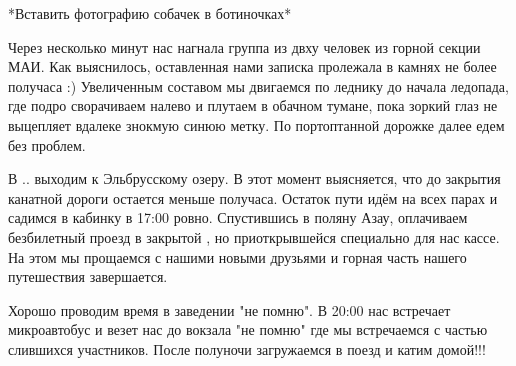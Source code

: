 *Вставить фотографию собачек в ботиночках*

Через несколько минут нас нагнала группа из двху человек из горной секции МАИ. Как выяснилось, оставленная нами записка пролежала в камнях не более получаса :) Увеличенным составом мы двигаемся по леднику до начала ледопада, где подро сворачиваем налево и плутаем в обачном тумане, пока зоркий глаз не выцепляет вдалеке знокмую синюю метку. По портоптанной дорожке далее едем без проблем. 

В .. выходим к Эльбрусскому озеру. В этот момент выясняется, что до закрытия канатной дороги остается меньше получаса. Остаток пути идём на всех парах и садимся в кабинку в 17:00 ровно. Спустившись в поляну Азау, оплачиваем безбилетный проезд в закрытой , но приоткрывшейся специально для нас кассе. На этом мы прощаемся с нашими новыми друзьями и горная часть нашего путешествия завершается.

Хорошо проводим время в заведении "не помню". В 20:00 нас встречает микроавтобус и везет нас до вокзала "не помню" где мы встречаемся с частью слившихся участников. После полуночи загружаемся в поезд и катим домой!!!







\newpage